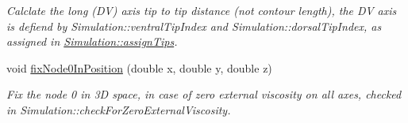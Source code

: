 \begin{DoxyCompactItemize}
\begin{DoxyCompactList}\small\item\em Calclate the long (D\+V) axis tip to tip distance (not contour length), the D\+V axis is defiend by Simulation\+::ventral\+Tip\+Index and Simulation\+::dorsal\+Tip\+Index, as assigned in \hyperlink{classSimulation_a7ed75e3d044166072754e6e323f3604c}{Simulation\+::assign\+Tips}. \end{DoxyCompactList}\item 
\hypertarget{classSimulation_a4897adef943963c8f79f45fcc52e409a}{}void \hyperlink{classSimulation_a4897adef943963c8f79f45fcc52e409a}{fix\+Node0\+In\+Position} (double x, double y, double z)\label{classSimulation_a4897adef943963c8f79f45fcc52e409a}

\begin{DoxyCompactList}\small\item\em Fix the node 0 in 3\+D space, in case of zero external viscosity on all axes, checked in Simulation\+::check\+For\+Zero\+External\+Viscosity. \end{DoxyCompactList}\end{DoxyCompactItemize}
